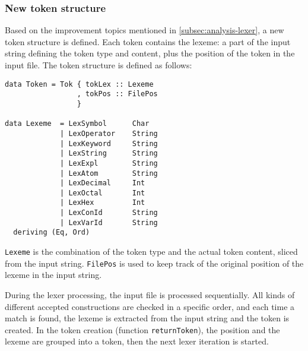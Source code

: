 \subsubsection{New token structure}
Based on the improvement topics mentioned in \autoref{subsec:analysis-lexer}, a new token structure is defined.
Each token contains the lexeme: a part of the input string defining the token type and content, plus the position of the token in the input file.
The token structure is defined as follows:

\begin{verbatim}
data Token = Tok { tokLex :: Lexeme
                 , tokPos :: FilePos
                 }
                        
data Lexeme  = LexSymbol      Char
             | LexOperator    String
             | LexKeyword     String
             | LexString      String
             | LexExpl        String
             | LexAtom        String
             | LexDecimal     Int
             | LexOctal       Int
             | LexHex         Int
             | LexConId       String
             | LexVarId       String
  deriving (Eq, Ord)
\end{verbatim}
%
\texttt{Lexeme} is the combination of the token type and the actual token content, sliced from the input string.
\texttt{FilePos} is used to keep track of the original position of the lexeme in the input string.

During the lexer processing, the input file is processed sequentially.
All kinds of different accepted constructions are checked in a specific order, and each time a match is found, the lexeme is extracted from the input string and the token is created.
In the token creation (function \texttt{returnToken}), the position and the lexeme are grouped into a token, then the next lexer iteration is started.
